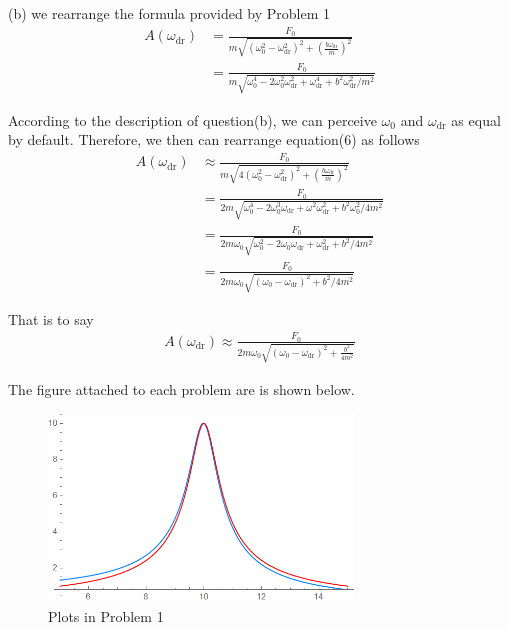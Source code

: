 \documentclass[12pt,a4paper]{article}
\begin{document}
\noindent (b) we rearrange the formula provided by Problem 1
\begin{align}
	A(\omega_{\text{dr}}) &= \frac{F_0}{m\sqrt{(\omega_0^2 - \omega_{\text{dr}}^2)^2 + \left( \frac{b\omega_{\text{dr}}}{m} \right)^2}}\\
	&= \frac{F_0}{m\sqrt{\omega_0^4 - 2\omega_0^2\omega_{\text{dr}}^2 + \omega_{\text{dr}}^4 + b^2\omega_{\text{dr}}^2/m^2}}
\end{align}
\par According to the description of question(b), we can perceive $\omega_0$ and $\omega_{\text{dr}}$ as equal by default. Therefore, we then can rearrange equation(6) as follows
\begin{align*}
	A(\omega_{\text{dr}}) &\approx \frac{F_0}{m\sqrt{4(\omega_0^2 - \omega_{\text{dr}}^2)^2 + \left( \frac{b\omega_{\text{dr}}}{m} \right)^2}}\\
	&= \frac{F_0}{2m\sqrt{\omega_0^4 - 2\omega_0^3\omega_{\text{dr}} + \omega^2\omega_{\text{dr}}^2 + b^2\omega_0^2/4m^2}}\\
	&= \frac{F_0}{2m\omega_0\sqrt{\omega_0^2 - 2\omega_0\omega_{\text{dr}} + \omega_{\text{dr}}^2 + b^2/4m^2}}\\
	&= \frac{F_0}{2m\omega_0\sqrt{(\omega_0 - \omega_{\text{dr}})^2 + b^2/4m^2}}
\end{align*}
\par That is to say
\begin{align}
	A(\omega_{\text{dr}}) \approx \frac{F_0}{2m\omega_0\sqrt{(\omega_0 - \omega_{\text{dr}})^2 + \frac{b^2}{4m^2}}}
\end{align}
\par The figure attached to each problem are is shown below.
\begin{figure}[H]
    \centering
    \includegraphics[height = 5cm]{1.png}
    \caption{Plots in Problem 1}
\end{figure}
\end{document}
